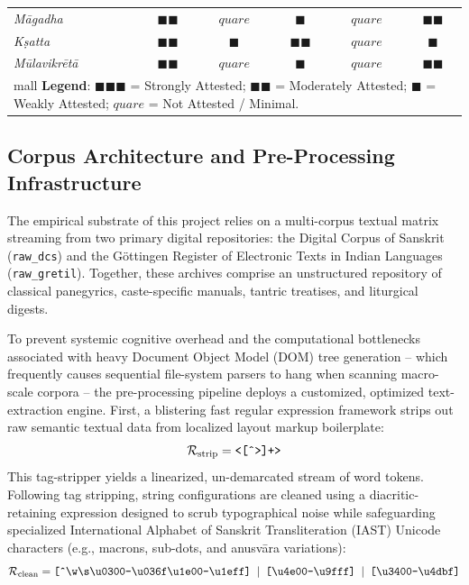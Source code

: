 \documentclass[11pt,twoside,letterpaper]{article}
\begin{document}
\begin{table}[ht]
{\begin{tabular}{lccccc}
\textit{M\={a}gadha}      & $\blacksquare\blacksquare$ & $quare$ & $\blacksquare$ & $quare$ & $\blacksquare\blacksquare$ \\
\textit{K\d{s}atta}       & $\blacksquare\blacksquare$ & $\blacksquare$ & $\blacksquare\blacksquare$ & $quare$ & $\blacksquare$ \\
\textit{M\={u}lavikrēt\={a}}  & $\blacksquare\blacksquare$ & $quare$ & $\blacksquare$ & $quare$ & $\blacksquare\blacksquare$ \\ \hline
\multicolumn{6}{l}{mall \textbf{Legend}: $\blacksquare\blacksquare\blacksquare$ = Strongly Attested; $\blacksquare\blacksquare$ = Moderately Attested; $\blacksquare$ = Weakly Attested; $quare$ = Not Attested / Minimal.}
\end{tabular}%
}
\end{table}


\subsection{Corpus Architecture and Pre-Processing Infrastructure}
The empirical substrate of this project relies on a multi-corpus textual matrix streaming from two primary digital repositories: the Digital Corpus of Sanskrit (\texttt{raw\_dcs}) and the Göttingen Register of Electronic Texts in Indian Languages (\texttt{raw\_gretil}). Together, these archives comprise an unstructured repository of classical panegyrics, caste-specific manuals, tantric treatises, and liturgical digests.

To prevent systemic cognitive overhead and the computational bottlenecks associated with heavy Document Object Model (DOM) tree generation -- which frequently causes sequential file-system parsers to hang when scanning macro-scale corpora -- the pre-processing pipeline deploys a customized, optimized text-extraction engine. First, a blistering fast regular expression framework strips out raw semantic textual data from localized layout markup boilerplate:
\begin{equation}
\mathcal{R}_{\text{strip}} = \text{\texttt{<[\^{}>]+>}}
\end{equation}
This tag-stripper yields a linearized, un-demarcated stream of word tokens. Following tag stripping, string configurations are cleaned using a diacritic-retaining expression designed to scrub typographical noise while safeguarding specialized International Alphabet of Sanskrit Transliteration (IAST) Unicode characters (e.g., macrons, sub-dots, and anusv\={a}ra variations):
\begin{equation}
\mathcal{R}_{\text{clean}} = \text{\texttt{[\^{}\textbackslash w\textbackslash s\textbackslash u0300-\textbackslash u036f\textbackslash u1e00-\textbackslash u1eff] \(\vert\) [\textbackslash u4e00-\textbackslash u9fff] \(\vert\) [\textbackslash u3400-\textbackslash u4dbf]}}
\end{equation}
\end{document}
